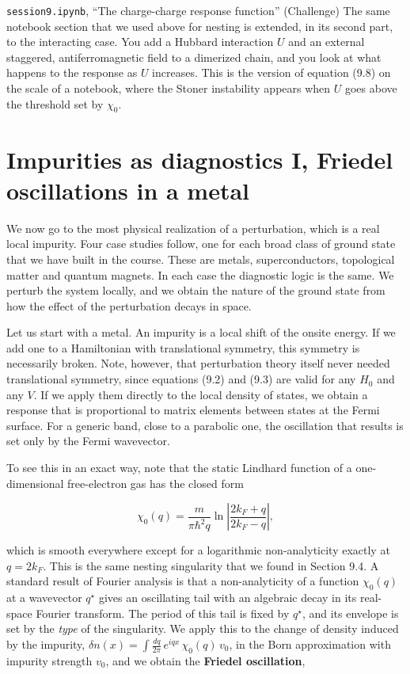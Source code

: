 \begin{notebookbox}{\texttt{session9.ipynb}, ``The charge-charge response function'' (Challenge)}
The same notebook section that we used above for nesting is extended, in its second part, to the
interacting case. You add a Hubbard interaction $U$ and an external staggered, antiferromagnetic
field to a dimerized chain, and you look at what happens to the response as $U$ increases. This is
the version of equation (9.8) on the scale of a notebook, where the Stoner instability appears when
$U$ goes above the threshold set by $\chi_0$.
\end{notebookbox}

\section{Impurities as diagnostics I, Friedel oscillations in a metal}

We now go to the most physical realization of a perturbation, which is a real local impurity. Four
case studies follow, one for each broad class of ground state that we have built in the course. These
are metals, superconductors, topological matter and quantum magnets. In each case the diagnostic
logic is the same. We perturb the system locally, and we obtain the nature of the ground state from
how the effect of the perturbation decays in space.

Let us start with a metal. An impurity is a local shift of the onsite energy. If we add one to a
Hamiltonian with translational symmetry, this symmetry is necessarily broken. Note, however, that
perturbation theory itself never needed translational symmetry, since equations (9.2) and (9.3) are
valid for any $H_0$ and any $V$. If we apply them directly to the local density of states, we obtain
a response that is proportional to matrix elements between states at the Fermi surface. For a
generic band, close to a parabolic one, the oscillation that results is set only by the Fermi
wavevector.

To see this in an exact way, note that the static Lindhard function of a one-dimensional
free-electron gas has the closed form

\begin{equation*}
\chi_0(q) = \frac{m}{\pi\hbar^2 q}\ln\left|\frac{2k_F + q}{2k_F - q}\right|,
\end{equation*}

which is smooth everywhere except for a logarithmic non-analyticity exactly at $q = 2k_F$. This is
the same nesting singularity that we found in Section 9.4. A standard result of Fourier analysis is
that a non-analyticity of a function $\chi_0(q)$ at a wavevector $q^\star$ gives an oscillating tail
with an algebraic decay in its real-space Fourier transform. The period of this tail is fixed by
$q^\star$, and its envelope is set by the \emph{type} of the singularity. We apply this to the change
of density induced by the impurity,
$\delta n(x) = \int \frac{dq}{2\pi}\, e^{iqx}\, \chi_0(q)\, v_0$, in the Born approximation with
impurity strength $v_0$, and we obtain the \textbf{Friedel oscillation},

